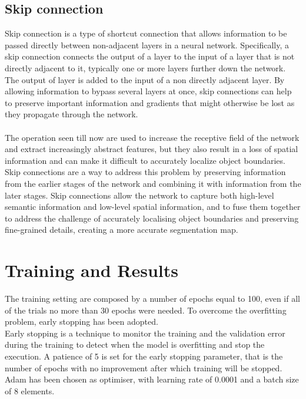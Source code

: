 \documentclass{article}
\begin{document}
\subsection{Skip connection}
Skip connection is a type of shortcut connection that allows information to be passed directly between non-adjacent layers in a neural network. Specifically, a skip connection connects the output of a layer to the input of a layer that is not directly adjacent to it, typically one or more layers further down the network. The output of  layer is added to the input of a non directly adjacent layer.  By allowing information to bypass several layers at once, skip connections can help to preserve important information and gradients that might otherwise be lost as they propagate through the network.\\\\
The operation seen till now are used to increase the receptive field of the network and extract increasingly abstract features, but they also result in a loss of spatial information and can make it difficult to accurately localize object boundaries.
Skip connections are a way to address this problem by preserving information from the earlier stages of the network and combining it with information from the later stages. Skip connections allow the network to capture both high-level semantic information and low-level spatial information, and to fuse them together to address the challenge of accurately localising object boundaries and preserving fine-grained details, creating a more accurate segmentation map.  
\section{Training and Results}\label{sec:results}
The training setting are composed by a number of epochs equal to 100, even if all of the trials no more than 30 epochs were needed. To overcome the overfitting problem, early stopping has been adopted.\\
Early stopping is a technique to monitor the training and the validation error during the training to detect when the model is overfitting and stop the execution. A patience of 5 is set for the early stopping parameter, that is the number of epochs with no improvement after which training will be stopped.\\
Adam has been chosen as optimiser, with learning rate of 0.0001 and a batch size of 8 elements.
\end{document}
